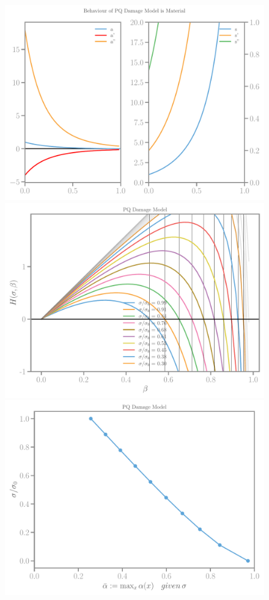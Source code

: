 \documentclass[]{article}
\begin{document}
\begin{figure}[htbp]
  \includegraphics[width=.33\textheight]{../figures/pq-31-model.pdf}
  \includegraphics[width=.33\textheight]{../figures/pq-Hbeta.pdf}
  \includegraphics[width=.33\textheight]{../figures/pq-maxalpha.pdf}

\end{figure}
\end{document}

